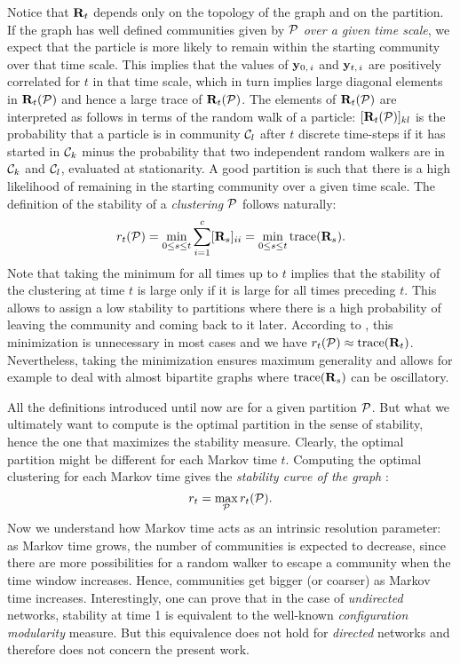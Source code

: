 Notice that $\b R_t$ depends only on the topology of the graph and on the partition. If the graph has well defined communities given by $\P$ \textit{over a given time scale}, we expect that the particle is more likely to remain within the starting community over that time scale. This implies that the values of $\b y_{0,\,i}$ and $\b y_{t,\,i}$ are positively correlated for $t$ in that time scale, which in turn implies large diagonal elements in $\b R_t(\P)$ and hence a large trace of $\b R_t(\P)$. The elements of $\b R_t(\P)$ are interpreted as follows in terms of the random walk of a particle: $[\b R_t(\P)]_{kl}$ is the probability that a particle is in community $\C_l$ after $t$ discrete time-steps if it has started in $\C_k$ minus the probability that two independent random walkers are in $\C_k$ and $\C_l$, evaluated at stationarity. A good partition is such that there is a high likelihood of remaining in the starting community over a given time scale. The definition of the stability of a \textit{clustering} $\P$ follows naturally:
\begin{equation}
	r_t(\P) = \min_{0 \le s \le t} \sum_{i = 1}^{c} [\b R_s]_{ii} = \min_{0 \le s \le t} \trace(\b R_s).
\end{equation}
Note that taking the minimum for all times up to $t$ implies that the stability of the clustering at time $t$ is large only if it is large for all times preceding $t$. This allows to assign a low stability to partitions where there is a high probability of leaving the community and coming back to it later. According to \cite{delvenne2013stability}, this minimization is unnecessary in most cases and we have $r_t(\P) \approx \trace(\b R_t)$. Nevertheless, taking the minimization ensures maximum generality and allows for example to deal with almost bipartite graphs where $\trace(\b R_s)$ can be oscillatory.

All the definitions introduced until now are for a given partition $\P$. But what we ultimately want to compute is the optimal partition in the sense of stability, hence the one that maximizes the stability measure. Clearly, the optimal partition might be different for each Markov time $t$. Computing the optimal clustering for each Markov time gives the \textit{stability curve of the graph} :
\begin{equation}
	r_t = \max_{\P} r_t(\P).
\end{equation}
Now we understand how Markov time acts as an intrinsic resolution parameter: as Markov time grows, the number of communities is expected to decrease, since there are more possibilities for a random walker to escape a community when the time window increases. Hence, communities get bigger (or coarser) as Markov time increases. Interestingly, one can prove that in the case of \textit{undirected} networks, stability at time 1 is equivalent to the well-known \textit{configuration modularity} measure. But this equivalence does not hold for \textit{directed} networks and therefore does not concern the present work.

